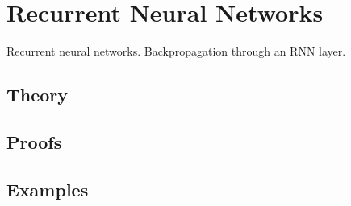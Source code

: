 
\section{Recurrent Neural Networks}
\label{sec:1.4.11-rnn}

\begin{ticket}
Recurrent neural networks. Backpropagation through an RNN layer.
\end{ticket}

\subsection*{Theory}

\subsection*{Proofs}

\subsection*{Examples}

